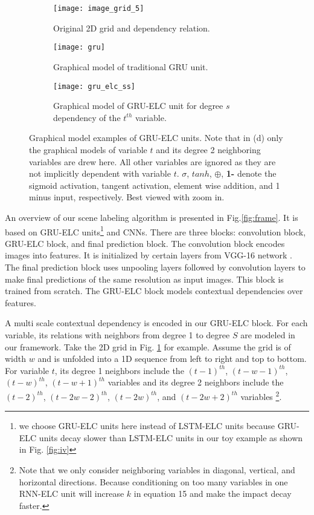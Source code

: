\documentclass[10pt,twocolumn,letterpaper]{article}
\begin{document}
\begin{figure}[t]
\centering

   \begin{subfigure}{0.45\linewidth}
   \centering
   \texttt{[image: image\_grid\_5]}
   \caption{Original 2D grid and dependency relation.}
   \label{fig:image_grid_5} 
\end{subfigure}
\hfill
\begin{subfigure}{0.45\linewidth}
   \centering
   \texttt{[image: gru]}
   \caption{Graphical model of traditional GRU unit.}
   \label{fig:gru}
\end{subfigure}
\begin{subfigure}{1\linewidth}
   \centering
   \texttt{[image: gru\_elc\_ss]}
   \caption{Graphical model of GRU-ELC unit for degree $s$ dependency of the $t^{th}$ variable.}
   \label{fig:gru_elc_s2}
\end{subfigure}

\centering
\caption{Graphical model examples of GRU-ELC units. Note that in (d) only the graphical models of variable $t$ and its degree 2 neighboring variables are drew here. All other variables are ignored as they are not implicitly dependent with variable $t$.  $\sigma$, $tanh$, $\oplus$, \textbf{1-} denote the sigmoid activation, tangent activation, element wise addition, and 1 minus input, respectively. Best viewed with zoom in.}
\end{figure}






An overview of our scene labeling algorithm is presented in Fig.\ref{fig:frame}. It is based on GRU-ELC units\footnote{we choose GRU-ELC units here instead of LSTM-ELC units because GRU-ELC units decay slower than LSTM-ELC units in our toy example as shown in Fig. \ref{fig:iv}} and CNNs. There are three blocks: convolution block, GRU-ELC block, and final prediction block. The convolution block encodes images into features. It is initialized by certain layers from VGG-16 network \cite{vgg}. The final prediction block uses unpooling layers followed by convolution layers to make final predictions of the same resolution as input images. This block is trained from scratch. The GRU-ELC block models contextual dependencies over features.

A multi scale contextual dependency is encoded in our GRU-ELC block. For each variable, its relations with neighbors from degree 1 to degree $S$ are modeled in our framework. Take the 2D grid in Fig. \ref{fig:image_grid_5} for example. Assume the grid is of width $w$ and is unfolded into a 1D sequence from left to right and top to bottom. For variable $t$, its degree 1 neighbors include the $(t-1)^{th}$, $(t-w-1)^{th}$, $(t-w)^{th}$, $(t-w+1)^{th}$ variables and its degree 2 neighbors include the $(t-2)^{th}$, $(t-2w-2)^{th}$, $(t-2w)^{th}$, and $(t-2w+2)^{th}$ variables \footnote{Note that we only consider neighboring variables in diagonal, vertical, and horizontal directions. Because conditioning on too many variables in one RNN-ELC unit will increase $k$ in equation 15 and make the impact decay faster.}.
\end{document}
